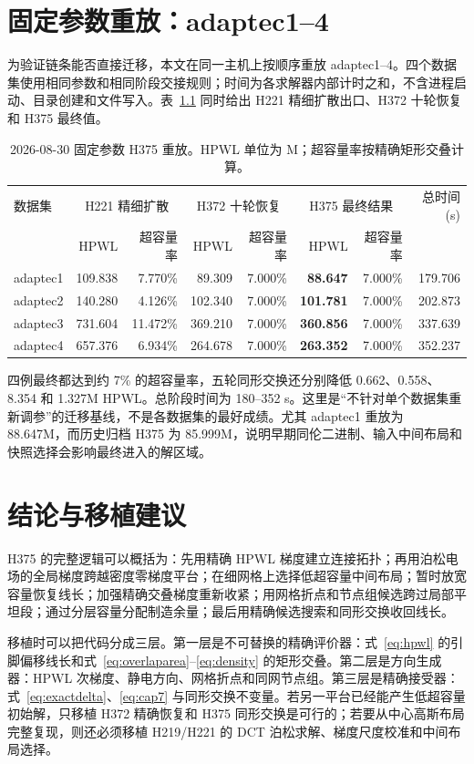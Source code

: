 \documentclass[UTF8,a4paper,11pt]{ctexrep}
\begin{document}
\chapter{固定参数重放：adaptec1--4}
为验证链条能否直接迁移，本文在同一主机上按顺序重放 adaptec1--4。四个数据集使用相同参数和相同阶段交接规则；时间为各求解器内部计时之和，不含进程启动、目录创建和文件写入。表~\ref{tab:replay} 同时给出 H221 精细扩散出口、H372 十轮恢复和 H375 最终值。

\begin{table}[H]
\centering\small
\caption{2026-08-30 固定参数 H375 重放。HPWL 单位为 M；超容量率按精确矩形交叠计算。}\label{tab:replay}
\begin{tabular}{lrrrrrrr}
\toprule
数据集 & \multicolumn{2}{c}{H221 精细扩散} & \multicolumn{2}{c}{H372 十轮恢复} & \multicolumn{2}{c}{H375 最终结果} & 总时间 (s)\\
 & HPWL & 超容量率 & HPWL & 超容量率 & HPWL & 超容量率 & \\\midrule
adaptec1 & 109.838 & 7.770\% & 89.309 & 7.000\% & \textbf{88.647} & 7.000\% & 179.706\\
adaptec2 & 140.280 & 4.126\% & 102.340 & 7.000\% & \textbf{101.781} & 7.000\% & 202.873\\
adaptec3 & 731.604 & 11.472\% & 369.210 & 7.000\% & \textbf{360.856} & 7.000\% & 337.639\\
adaptec4 & 657.376 & 6.934\% & 264.678 & 7.000\% & \textbf{263.352} & 7.000\% & 352.237\\
\bottomrule
\end{tabular}
\end{table}

四例最终都达到约 7\% 的超容量率，五轮同形交换还分别降低 0.662、0.558、8.354 和 1.327M HPWL。总阶段时间为 180--352 s。这里是“不针对单个数据集重新调参”的迁移基线，不是各数据集的最好成绩。尤其 adaptec1 重放为 88.647M，而历史归档 H375 为 85.999M，说明早期同伦二进制、输入中间布局和快照选择会影响最终进入的解区域。

\chapter{结论与移植建议}
H375 的完整逻辑可以概括为：先用精确 HPWL 梯度建立连接拓扑；再用泊松电场的全局梯度跨越密度零梯度平台；在细网格上选择低超容量中间布局；暂时放宽容量恢复线长；加强精确交叠梯度重新收紧；用网格折点和节点组候选跨过局部平坦段；通过分层容量分配制造余量；最后用精确候选搜索和同形交换收回线长。

移植时可以把代码分成三层。第一层是不可替换的精确评价器：式~\eqref{eq:hpwl} 的引脚偏移线长和式~\eqref{eq:overlaparea}--\eqref{eq:density} 的矩形交叠。第二层是方向生成器：HPWL 次梯度、静电方向、网格折点和同网节点组。第三层是精确接受器：式~\eqref{eq:exactdelta}、\eqref{eq:cap7} 与同形交换不变量。若另一平台已经能产生低超容量初始解，只移植 H372 精确恢复和 H375 同形交换是可行的；若要从中心高斯布局完整复现，则还必须移植 H219/H221 的 DCT 泊松求解、梯度尺度校准和中间布局选择。
\end{document}
